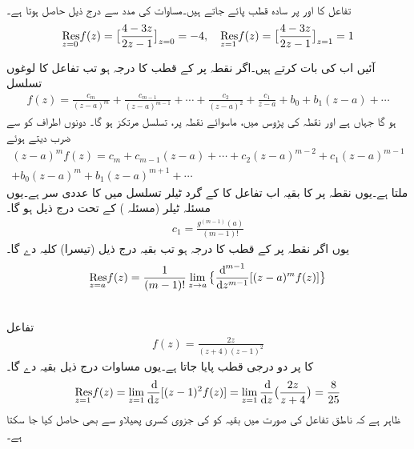 \quad {}\\
تفاعل  کا  اور  پر سادہ قطب پائے جاتے ہیں۔مساوات کی مدد سے درج ذیل حاصل ہوتا ہے۔
\begin{align*}
\underset{z=0\hfill}{\Res} f(z)=\big[\frac{4-3z}{2z-1}\big]_{z=0}=-4,\quad \underset{z=1\hfill}{\Res} f(z) =\big[\frac{4-3z}{2z-1}\big]_{z=1}=1
\end{align*}

آئیں اب  کی بات کرتے ہیں۔اگر نقطہ  پر  کے قطب کا درجہ  ہو تب  تفاعل کا لوغوں تسلسل
\begin{align*}
f(z)=\frac{c_m}{(z-a)^m}+\frac{c_{m-1}}{(z-a)^{m-1}}+\cdots+\frac{c_2}{(z-a)^2}+\frac{c_1}{z-a}
+b_0+b_1(z-a)+\cdots
\end{align*}
ہو گا جہاں  ہے اور نقطہ  کی پڑوس میں، ماسوائے نقطہ  پر، تسلسل مرتکز ہو گا۔ دونوں اطراف کو  سے ضرب دیتے ہوئے 
\begin{multline*}
(z-a)^m f(z)=c_m+c_{m-1}(z-a)+\cdots+c_2(z-a)^{m-2}+c_1(z-a)^{m-1}\\
+b_0(z-a)^m+b_1(z-a)^{m+1}+\cdots
\end{multline*}
ملتا ہے۔یوں نقطہ  پر  کا بقیہ  اب تفاعل  کا  کے گرد  ٹیلر تسلسل میں  کا عددی سر ہے۔یوں مسئلہ ٹیلر (مسئلہ ) کے تحت درج ذیل ہو گا۔
\begin{align*}
c_1=\frac{g^{(m-1)}(a)}{(m-1)!}
\end{align*}
یوں اگر نقطہ  پر  کے قطب کا درجہ  ہو تب بقیہ درج ذیل (تیسرا) کلیہ دے گا۔
\begin{align}\label{مساوات_بقیہ_تیسرا_کلیہ}
\underset{z=a\hfill}{\Res} f(z)=\frac{1}{(m-1)!}\lim_{z\to a}\big\{\frac{\dif^{\, m-1}}{\dif z^{m-1}}[(z-a)^mf(z)]\big\}
\end{align}

\quad {}\\
تفاعل
\begin{align*}
f(z)=\frac{2z}{(z+4)(z-1)^2}
\end{align*}
کا  پر دو درجی قطب پایا جاتا ہے۔یوں مساوات  درج ذیل بقیہ دے گا۔
\begin{align*}
\underset{z=1\hfill}{\Res} f(z)=\lim_{z=1}\frac{\dif}{\dif z}[(z-1)^2 f(z)]=\lim_{z=1}\frac{\dif}{\dif z}\big(\frac{2z}{z+4}\big)=\frac{8}{25}
\end{align*}
ظاہر ہے کہ ناطق تفاعل  کی صورت میں بقیہ کو  کی جزوی کسری پھیلاو سے بھی حاصل کیا جا سکتا ہے۔

